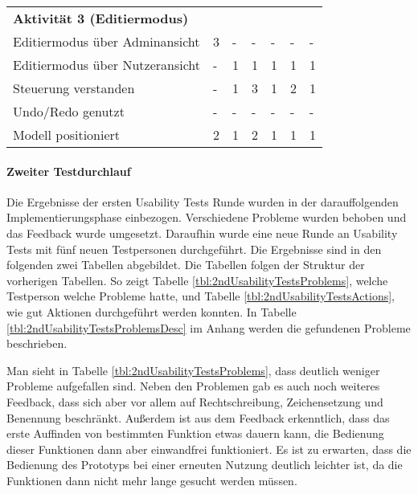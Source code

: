 \begin{table}[H]
\begin{tabular}{l|llllll}
        \textbf{Aktivität 3 (Editiermodus)} &           &           &           &           &           &           \\
        Editiermodus über Adminansicht       &         3 &         - &         - &         - &         - &         - \\
        Editiermodus über Nutzeransicht      &         - &         1 &         1 &         1 &         1 &         1 \\
        Steuerung verstanden                &         - &         1 &         3 &         1 &         2 &         1 \\
        Undo/Redo genutzt                   &         - &         - &         - &         - &         - &         - \\
        Modell positioniert                 &         2 &         1 &         2 &         1 &         1 &         1 \\
    \end{tabular}
\end{table}


\paragraph{Zweiter Testdurchlauf}\label{sec:secondUsabilityTests}

Die Ergebnisse der ersten Usability Tests Runde wurden in der darauffolgenden Implementierungsphase einbezogen. Verschiedene Probleme wurden behoben und das Feedback wurde umgesetzt. Daraufhin wurde eine neue Runde an Usability Tests mit fünf neuen Testpersonen durchgeführt. Die Ergebnisse sind in den folgenden zwei Tabellen abgebildet. Die Tabellen folgen der Struktur der vorherigen Tabellen. So zeigt Tabelle \ref{tbl:2ndUsabilityTestsProblems}, welche Testperson welche Probleme hatte, und Tabelle \ref{tbl:2ndUsabilityTestsActions}, wie gut Aktionen durchgeführt werden konnten. In Tabelle \ref{tbl:2ndUsabilityTestsProblemsDesc} im Anhang werden die gefundenen Probleme beschrieben. 

Man sieht in Tabelle \ref{tbl:2ndUsabilityTestsProblems}, dass deutlich weniger Probleme aufgefallen sind. Neben den Problemen gab es auch noch weiteres Feedback, dass sich aber vor allem auf Rechtschreibung, Zeichensetzung und Benennung beschränkt. Außerdem ist aus dem Feedback erkenntlich, dass das erste Auffinden von bestimmten Funktion etwas dauern kann, die Bedienung dieser Funktionen dann aber einwandfrei funktioniert. Es ist zu erwarten, dass die Bedienung des Prototyps bei einer erneuten Nutzung deutlich leichter ist, da die Funktionen dann nicht mehr lange gesucht werden müssen.

